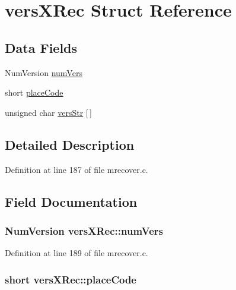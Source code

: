 \hypertarget{structversXRec}{\section{vers\+X\+Rec Struct Reference}
\label{structversXRec}
}
\subsection*{Data Fields}
\begin{DoxyCompactItemize}
\item 
Num\+Version \hyperlink{structversXRec_ada29f8022b3d99ffc00af700da41c4be}{num\+Vers}
\item 
short \hyperlink{structversXRec_afe40a63311e72b843842eaf132852cd1}{place\+Code}
\item 
unsigned char \hyperlink{structversXRec_a1b00ec8928fe4c940d341a9e2aa46b50}{vers\+Str} \mbox{[}$\,$\mbox{]}
\end{DoxyCompactItemize}


\subsection{Detailed Description}


Definition at line 187 of file mrecover.\+c.



\subsection{Field Documentation}
\hypertarget{structversXRec_ada29f8022b3d99ffc00af700da41c4be}{
\subsubsection[{num\+Vers}]{\setlength{\rightskip}{0pt plus 5cm}Num\+Version vers\+X\+Rec\+::num\+Vers}}\label{structversXRec_ada29f8022b3d99ffc00af700da41c4be}


Definition at line 189 of file mrecover.\+c.

\hypertarget{structversXRec_afe40a63311e72b843842eaf132852cd1}{
\subsubsection[{place\+Code}]{\setlength{\rightskip}{0pt plus 5cm}short vers\+X\+Rec\+::place\+Code}}\label{structversXRec_afe40a63311e72b843842eaf132852cd1}


